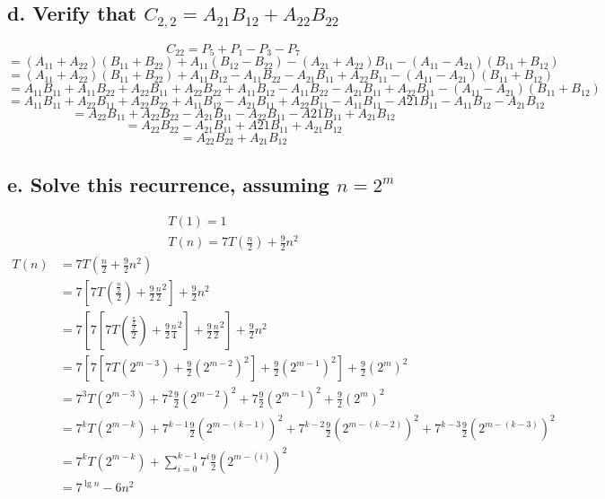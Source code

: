 \documentclass{article}
\begin{document}
    \subsection*{d. Verify that \(C_{2,2} = A_{21}B_{12} + A_{22}B_{22}\)}
    \[C_{22} = P_5 + P_1 - P_3 - P_7\]
    \[= (A_{11} + A_{22})(B_{11} + B_{22}) + A_{11}(B_{12} - B_{22}) - (A_{21} + A_{22})B_{11} - (A_{11} - A_{21})(B_{11} + B_{12})\]
    \[= (A_{11} + A_{22})(B_{11} + B_{22}) + A_{11}B_{12} - A_{11}B_{22} - A_{21}B_{11} + A_{22}B_{11} - (A_{11} - A_{21})(B_{11} + B_{12})\]
    \[= A_{11}B_{11} + A_{11}B_{22} + A_{22}B_{11} + A_{22}B_{22} + A_{11}B_{12} - A_{11}B_{22} - A_{21}B_{11} + A_{22}B_{11} - (A_{11} - A_{21})(B_{11} + B_{12})\]
    \[= A_{11}B_{11} + A_{22}B_{11} + A_{22}B_{22} + A_{11}B_{12} - A_{21}B_{11} + A_{22}B_{11} - A_{11}B_{11} - A{21}B_{11} - A_{11}B_{12} - A_{21}B_{12}\]
    \[= A_{22}B_{11} + A_{22}B_{22} - A_{21}B_{11} - A_{22}B_{11} - A{21}B_{11} + A_{21}B_{12}\]
    \[= A_{22}B_{22} - A_{21}B_{11} + A{21}B_{11} + A_{21}B_{12}\]
    \[= A_{22}B_{22} + A_{21}B_{12}\]
    \subsection*{e. Solve this recurrence, assuming \(n = 2^m\)}
    \begin{align*}
        T(1) = 1 \\
        T(n) = 7T(\frac{n}{2}) + \frac{9}{2}n^2
    \end{align*}
    \begin{subequations}
        \begin{align}
            T(n) &= 7T(\frac{n}{2} + \frac{9}{2}n^2) \\
            &= 7[7T(\frac{\frac{n}{2}}{2}) + \frac{9}{2}\frac{n}{2}^2] + \frac{9}{2}n^2 \\
            &= 7[7[7T(\frac{\frac{\frac{n}{2}}{2}}{2}) + \frac{9}{2}\frac{n}{4}^2] + \frac{9}{2}\frac{n}{2}^2] + \frac{9}{2}n^2 \\
            &= 7[7[7T(2^{m-3}) + \frac{9}{2}(2^{m-2})^2] + \frac{9}{2}(2^{m-1})^2] + \frac{9}{2}(2^{m})^2 \\
            &= 7^3T(2^{m-3}) + 7^2\frac{9}{2}(2^{m-2})^2 + 7\frac{9}{2}(2^{m-1})^2 + \frac{9}{2}(2^{m})^2 \\
            &= 7^kT(2^{m-k}) + 7^{k-1}\frac{9}{2}(2^{m-(k-1)})^2 + 7^{k-2}\frac{9}{2}(2^{m-(k-2)})^2 + 7^{k-3}\frac{9}{2}(2^{m-(k-3)})^2 \\
            &= 7^kT(2^{m-k}) + \sum_{i=0}^{k-1} 7^{i}\frac{9}{2}(2^{m-(i)})^2 \\
            &= 7^{\lg{n}} - 6n^2
        \end{align}
    \end{subequations}
\end{document}
